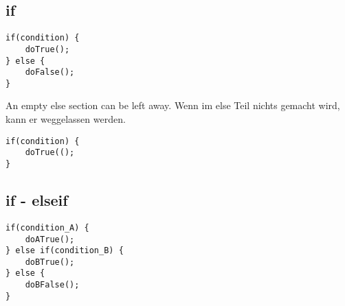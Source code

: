 \subsection{if}
\begin{lstlisting}
if(condition) {
    doTrue();
} else {
    doFalse();
}
\end{lstlisting}
\ifen
An empty else section can be left away. 
\fi
\ifde
Wenn im else Teil nichts gemacht wird, kann er weggelassen werden. 
\fi
\begin{lstlisting}
if(condition) {
    doTrue(();
}
\end{lstlisting}

\subsection{if - elseif}
\begin{lstlisting}
if(condition_A) {
    doATrue();
} else if(condition_B) {
    doBTrue();
} else {
    doBFalse();
}
\end{lstlisting}
